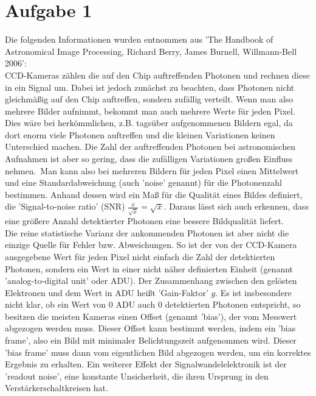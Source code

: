\section{Aufgabe 1}
Die folgenden Informationen wurden entnommen aus 'The Handbook of Astronomical Image Processing, Richard Berry, James Burnell, Willmann-Bell 2006':
\\
CCD-Kameras zählen die auf den Chip auftreffenden Photonen und rechnen diese in ein Signal um. Dabei ist jedoch zunächst zu beachten, dass Photonen nicht gleichmäßig auf den Chip auftreffen, sondern zufällig verteilt. Wenn man also mehrere Bilder aufnimmt, bekommt man auch mehrere Werte für jeden Pixel. Dies wäre bei herkömmlichen, z.B. tagsüber aufgenommenen Bildern egal, da dort enorm viele Photonen auftreffen und die kleinen Variationen keinen Unterschied machen. Die Zahl der auftreffenden Photonen bei astronomischen Aufnahmen ist aber so gering, dass die zufälligen Variationen großen Einfluss nehmen.\
Man kann also bei mehreren Bildern für jeden Pixel einen Mittelwert und eine Standardabweichung (auch 'noise' genannt) für die Photonenzahl bestimmen. Anhand dessen wird ein Maß für die Qualität eines Bildes definiert, die 'Signal-to-noise ratio' (SNR) $\frac{\overline{x}}{\sqrt{\overline{x}}} = \sqrt{\overline{x}}$.  Daraus lässt sich auch erkennen, dass eine größere Anzahl detektierter Photonen eine bessere Bildqualität liefert.\\
Die reine statistische Varianz der ankommenden Photonen ist aber nicht die einzige Quelle für Fehler bzw. Abweichungen. So ist der von der CCD-Kamera ausgegebene Wert für jeden Pixel nicht einfach die Zahl der detektierten Photonen, sondern ein Wert in einer nicht näher definierten Einheit (genannt 'analog-to-digital unit' oder ADU). Der Zusammenhang zwischen den gelösten Elektronen und dem Wert in ADU heißt 'Gain-Faktor' $g$. Es ist insbesondere nicht klar, ob ein Wert von 0 ADU auch 0 detektierten Photonen entspricht, so besitzen die meisten Kameras einen Offset (genannt 'bias'), der vom Messwert abgezogen werden muss. Dieser Offset kann bestimmt werden, indem ein 'bias frame', also ein Bild mit minimaler Belichtungszeit aufgenommen wird. Dieser 'bias frame' muss dann vom eigentlichen Bild abgezogen werden, um ein korrektes Ergebnis zu erhalten. Ein weiterer Effekt der Signalwandelelektronik ist der 'readout noise', eine konstante Unsicherheit, die ihren Ursprung in den Verstärkerschaltkreisen hat.
\\
